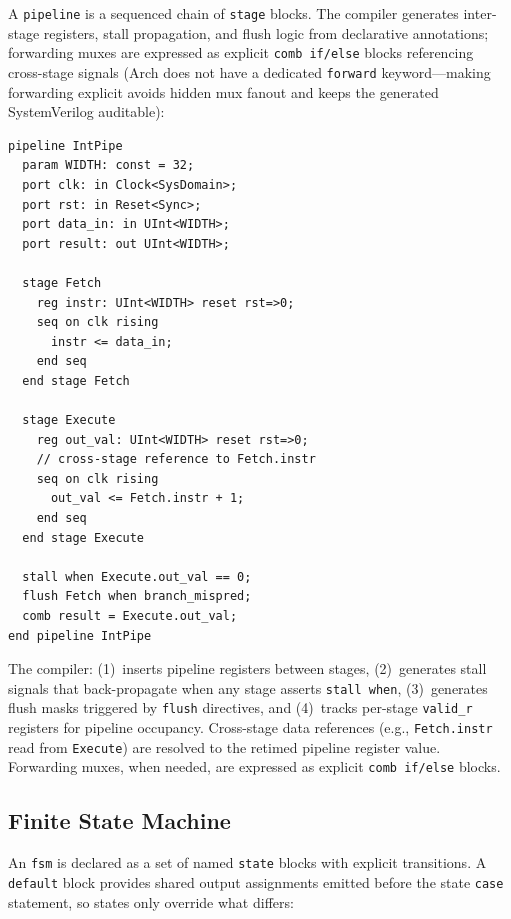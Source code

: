 \documentclass[11pt,twocolumn]{article}
\begin{document}
A \texttt{pipeline} is a sequenced chain of \texttt{stage} blocks. The compiler generates inter-stage registers, stall propagation, and flush logic from declarative annotations; forwarding muxes are expressed as explicit \texttt{comb if/else} blocks referencing cross-stage signals (Arch does not have a dedicated \texttt{forward} keyword---making forwarding explicit avoids hidden mux fanout and keeps the generated SystemVerilog auditable):

\begin{lstlisting}[language=Arch,caption={Pipeline with forwarding},label={lst:pipe}]
pipeline IntPipe
  param WIDTH: const = 32;
  port clk: in Clock<SysDomain>;
  port rst: in Reset<Sync>;
  port data_in: in UInt<WIDTH>;
  port result: out UInt<WIDTH>;

  stage Fetch
    reg instr: UInt<WIDTH> reset rst=>0;
    seq on clk rising
      instr <= data_in;
    end seq
  end stage Fetch

  stage Execute
    reg out_val: UInt<WIDTH> reset rst=>0;
    // cross-stage reference to Fetch.instr
    seq on clk rising
      out_val <= Fetch.instr + 1;
    end seq
  end stage Execute

  stall when Execute.out_val == 0;
  flush Fetch when branch_mispred;
  comb result = Execute.out_val;
end pipeline IntPipe
\end{lstlisting}

The compiler:
(1)~inserts pipeline registers between stages,
(2)~generates stall signals that back-propagate when any stage asserts \texttt{stall when},
(3)~generates flush masks triggered by \texttt{flush} directives, and
(4)~tracks per-stage \texttt{valid\_r} registers for pipeline occupancy.
Cross-stage data references (e.g., \texttt{Fetch.instr} read from \texttt{Execute}) are resolved to the retimed pipeline register value. Forwarding muxes, when needed, are expressed as explicit \texttt{comb if/else} blocks.

\subsection{Finite State Machine}

An \texttt{fsm} is declared as a set of named \texttt{state} blocks with explicit transitions. A \texttt{default} block provides shared output assignments emitted before the state \texttt{case} statement, so states only override what differs:
\end{document}
